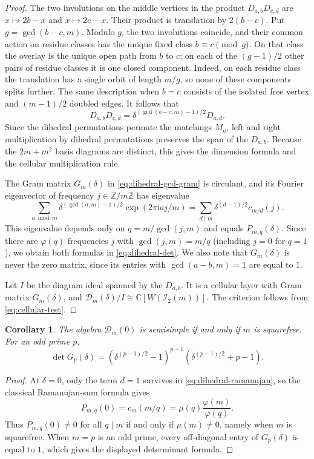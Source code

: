 \documentclass[11pt,a4paper]{amsart}
\newtheorem{corollary}[theorem]{Corollary}
\theoremstyle{uprightdefinition}
\theoremstyle{remark}\newtheorem{remark}[theorem]{Remark}
\begin{document}
\begin{proof}
The two involutions on the middle vertices in the product
$D_{a,b}D_{c,d}$ are $x\mapsto2b-x$ and $x\mapsto2c-x$.
Their product is translation by $2(b-c)$. Put $g=\gcd(b-c,m)$.
Modulo $g$, the two involutions coincide, and their common action on residue
classes has the unique fixed class $b\equiv c\pmod g$.
On that class the overlay is the unique open path from $b$ to $c$; on each
of the $(g-1)/2$ other pairs of residue classes it is one closed component.
Indeed, on each residue class the translation has a single orbit of length
$m/g$, so none of these components splits further. The same description
when $b=c$ consists of the isolated free vertex and $(m-1)/2$ doubled edges.
It follows that
\[
 D_{a,b}D_{c,d}
   =\delta^{(\gcd(b-c,m)-1)/2}D_{a,d}.
\]
Since the dihedral permutations permute the matchings $M_a$, left and right multiplication by dihedral permutations
preserves the span of the $D_{a,b}$. Because the $2m+m^2$ basis diagrams are
distinct, this gives the dimension formula and the cellular multiplication rule.

The Gram matrix $G_m(\delta)$ in \eqref{eq:dihedral-gcd-gram} is circulant, and its Fourier eigenvector
of frequency $j\in\mathbb Z/m\mathbb Z$ has eigenvalue
\[
 \sum_{a\bmod m}\delta^{(\gcd(a,m)-1)/2}
                     \exp(2\pi\mathrm i aj/m)
   =\sum_{d\mid m}\delta^{(d-1)/2}c_{m/d}(j).
\]
This eigenvalue depends only on $q=m/\gcd(j,m)$ and equals $P_{m,q}(\delta)$. Since there are
$\varphi(q)$ frequencies $j$ with $\gcd(j,m)=m/q$ (including $j=0$ for
$q=1$), we obtain both formulas in \eqref{eq:dihedral-det}. We also note that $G_m(\delta)$ is never the zero matrix, since its entries with
$\gcd(a-b,m)=1$ are equal to $1$.

Let $I$ be the diagram ideal spanned by the $D_{a,b}$.
It is a cellular layer with Gram matrix $G_m(\delta)$, and
$\mathcal D_m(\delta)/I\cong\mathbb C[W(\mathscr{I}_2(m))]$.
The criterion follows from \eqref{eq:cellular-test}.
\end{proof}

\begin{corollary}\label{cor:odd-dihedral-zero}
The algebra $\mathcal D_m(0)$ is semisimple if and only if $m$ is
squarefree. For an odd prime $p$,
\[
 \det G_p(\delta)=
 (\delta^{(p-1)/2}-1)^{p-1}(\delta^{(p-1)/2}+p-1).
\]
\end{corollary}
\begin{proof}
At $\delta=0$, only the term $d=1$ survives in
\eqref{eq:dihedral-ramanujan}, so the classical Ramanujan-sum formula gives
\[
 P_{m,q}(0)=c_m(m/q)=\mu(q)\frac{\varphi(m)}{\varphi(q)}.
\]
Thus $P_{m,q}(0)\ne0$ for all $q\mid m$ if and only if $\mu(m)\ne0$, namely when $m$ is squarefree.
When $m=p$ is an odd prime, every off-diagonal entry of $G_p(\delta)$ is equal to $1$, which gives
the displayed determinant formula.
\end{proof}
\end{document}
